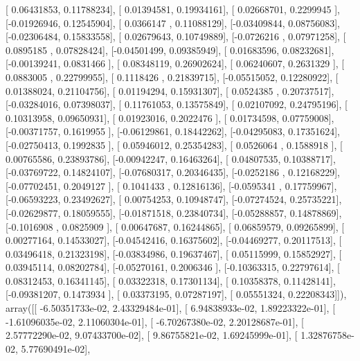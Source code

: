 \documentclass{article}
\begin{document}
       [ 0.06431853,  0.11788234],
       [ 0.01394581,  0.19934161],
       [ 0.02668701,  0.2299945 ],
       [-0.01926946,  0.12545904],
       [ 0.0366147 ,  0.11088129],
       [-0.03409844,  0.08756083],
       [-0.02306484,  0.15833558],
       [ 0.02679643,  0.10749889],
       [-0.0726216 ,  0.07971258],
       [ 0.0895185 ,  0.07828424],
       [-0.04501499,  0.09385949],
       [ 0.01683596,  0.08232681],
       [-0.00139241,  0.0831466 ],
       [ 0.08348119,  0.26902624],
       [ 0.06240607,  0.2631329 ],
       [ 0.0883005 ,  0.22799955],
       [ 0.1118426 ,  0.21839715],
       [-0.05515052,  0.12280922],
       [ 0.01388024,  0.21104756],
       [ 0.01194294,  0.15931307],
       [ 0.0524385 ,  0.20737517],
       [-0.03284016,  0.07398037],
       [ 0.11761053,  0.13575849],
       [ 0.02107092,  0.24795196],
       [ 0.10313958,  0.09650931],
       [ 0.01923016,  0.2022476 ],
       [ 0.01734598,  0.07759008],
       [-0.00371757,  0.1619955 ],
       [-0.06129861,  0.18442262],
       [-0.04295083,  0.17351624],
       [-0.02750413,  0.1992835 ],
       [ 0.05946012,  0.25354283],
       [ 0.0526064 ,  0.1588918 ],
       [ 0.00765586,  0.23893786],
       [-0.00942247,  0.16463264],
       [ 0.04807535,  0.10388717],
       [-0.03769722,  0.14824107],
       [-0.07680317,  0.20346435],
       [-0.0252186 ,  0.12168229],
       [-0.07702451,  0.2049127 ],
       [ 0.1041433 ,  0.12816136],
       [-0.0595341 ,  0.17759967],
       [-0.06593223,  0.23492627],
       [ 0.00754253,  0.10948747],
       [-0.07274524,  0.25735221],
       [-0.02629877,  0.18059555],
       [-0.01871518,  0.23840734],
       [-0.05288857,  0.14878869],
       [-0.1016908 ,  0.0825909 ],
       [ 0.00647687,  0.16244865],
       [ 0.06859579,  0.09265899],
       [ 0.00277164,  0.14533027],
       [-0.04542416,  0.16375602],
       [-0.04469277,  0.20117513],
       [ 0.03496418,  0.21323198],
       [-0.03834986,  0.19637467],
       [ 0.05115999,  0.15852927],
       [ 0.03945114,  0.08202784],
       [-0.05270161,  0.2006346 ],
       [-0.10363315,  0.22797614],
       [ 0.08312453,  0.16341145],
       [ 0.03322318,  0.17301134],
       [ 0.10358378,  0.11428141],
       [-0.09381207,  0.1473934 ],
       [ 0.03373195,  0.07287197],
       [ 0.05551324,  0.22208343]]), array([[ -6.50351733e-02,   2.43329484e-01],
       [  6.94838933e-02,   1.89223322e-01],
       [ -1.61096035e-02,   2.11060304e-01],
       [ -6.70267380e-02,   2.20128687e-01],
       [  2.57772290e-02,   9.07433700e-02],
       [  9.86755821e-02,   1.69245999e-01],
       [  1.32876758e-02,   5.77690491e-02],
\end{document}
